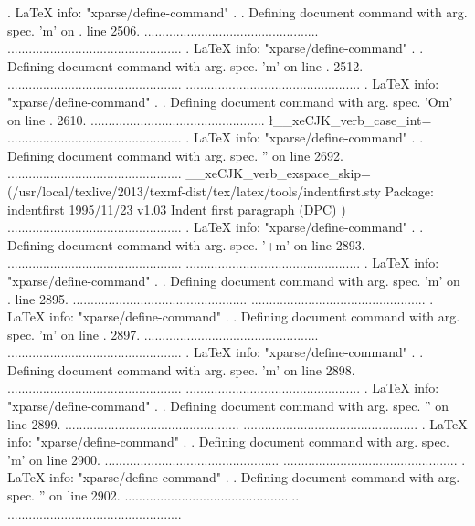 . LaTeX info: "xparse/define-command"
. 
. Defining document command  with arg. spec. 'm' on
. line 2506.
.................................................
.................................................
. LaTeX info: "xparse/define-command"
. 
. Defining document command \addCJKfontfeatures with arg. spec. 'm' on line
. 2512.
.................................................
.................................................
. LaTeX info: "xparse/define-command"
. 
. Defining document command \setCJKmathfont with arg. spec. 'O{}m' on line
. 2610.
.................................................
\l__xeCJK_verb_case_int=
.................................................
. LaTeX info: "xparse/define-command"
. 
. Defining document command \xeCJKVerbAddon with arg. spec. '' on line 2692.
.................................................
\g__xeCJK_verb_exspace_skip=
(/usr/local/texlive/2013/texmf-dist/tex/latex/tools/indentfirst.sty
Package: indentfirst 1995/11/23 v1.03 Indent first paragraph (DPC)
)
.................................................
. LaTeX info: "xparse/define-command"
. 
. Defining document command \xeCJKsetup with arg. spec. '+m' on line 2893.
.................................................
.................................................
. LaTeX info: "xparse/define-command"
. 
. Defining document command \xeCJKsetemboldenfactor with arg. spec. 'm' on
. line 2895.
.................................................
.................................................
. LaTeX info: "xparse/define-command"
. 
. Defining document command \xeCJKsetslantfactor with arg. spec. 'm' on line
. 2897.
.................................................
.................................................
. LaTeX info: "xparse/define-command"
. 
. Defining document command \punctstyle with arg. spec. 'm' on line 2898.
.................................................
.................................................
. LaTeX info: "xparse/define-command"
. 
. Defining document command \xeCJKplainchr with arg. spec. '' on line 2899.
.................................................
.................................................
. LaTeX info: "xparse/define-command"
. 
. Defining document command \CJKsetecglue with arg. spec. 'm' on line 2900.
.................................................
.................................................
. LaTeX info: "xparse/define-command"
. 
. Defining document command \CJKspace with arg. spec. '' on line 2902.
.................................................
.................................................
